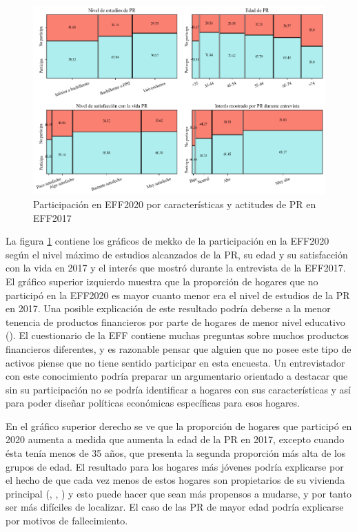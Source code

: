 \begin{figure}[h]
	\centering
	\includegraphics[width=1\textwidth]{figs/figure2.png}
	\caption{Participación en EFF2020 por características y actitudes de PR en EFF2017}
	\label{fig:fig2}
\end{figure}

La figura \ref{fig:fig2} contiene los gráficos de mekko de la participación en la EFF2020 según el nivel máximo de estudios alcanzados de la PR, su edad y su satisfacción con la vida en 2017 y el interés que mostró durante la entrevista de la EFF2017. El gráfico superior izquierdo muestra que la proporción de hogares que no participó en la EFF2020 es mayor cuanto menor era el nivel de estudios de la PR en 2017. Una posible explicación de este resultado podría deberse a la menor tenencia de productos financieros por parte de hogares de menor nivel educativo (\cite{hospido2023encuesta}). El cuestionario de la EFF contiene muchas preguntas sobre muchos productos financieros diferentes, y es razonable pensar que alguien que no posee este tipo de activos piense que no tiene sentido participar en esta encuesta. Un entrevistador con este conocimiento podría preparar un argumentario orientado a destacar que sin su participación no se podría identificar a hogares con sus características y así para poder diseñar políticas económicas específicas para esos hogares.

En el gráfico superior derecho se ve que la proporción de hogares que participó en 2020 aumenta a medida que aumenta la edad de la PR en 2017, excepto cuando ésta tenía menos de 35 años, que presenta la segunda proporción más alta de los grupos de edad. El resultado para los hogares más jóvenes podría explicarse por el hecho de que cada vez menos de estos hogares son propietarios de su vivienda principal (\cite{eff2014results}, \cite{eff2017results}, \cite{eff2020results}) y esto puede hacer que sean más propensos a mudarse, y por tanto ser más difíciles de localizar. El caso de las PR de mayor edad podría explicarse por motivos de fallecimiento.

